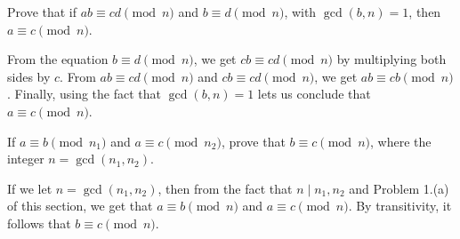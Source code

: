 \begin{exercise}
    Prove that if $ab \equiv cd \pmod n$ and $b \equiv d \pmod n$, with $\gcd(b,n) = 1$, then $a \equiv c \pmod n$. \\
\end{exercise}

\begin{solution}
    From the equation $b \equiv d \pmod n$, we get $cb \equiv cd \pmod n$ by multiplying both sides by $c$. From $ab \equiv cd \pmod n$ and $cb \equiv cd \pmod n$, we get $ab \equiv cb \pmod n$. Finally, using the fact that $\gcd(b,n) = 1$ lets us conclude that $a \equiv c \pmod n$. \\
\end{solution}

\begin{exercise}
    If $a \equiv b \pmod{n_1}$ and $a \equiv c \pmod{n_2}$, prove that $b \equiv c \pmod{n}$, where the integer $n = \gcd(n_1, n_2)$. \\
\end{exercise}

\begin{solution}
    If we let $n = \gcd(n_1, n_2)$, then from the fact that $n \mid n_1, n_2$ and Problem 1.(a) of this section, we get that $a \equiv b \pmod{n}$ and $a \equiv c \pmod{n}$. By transitivity, it follows that $b \equiv c \pmod n$.
\end{solution}